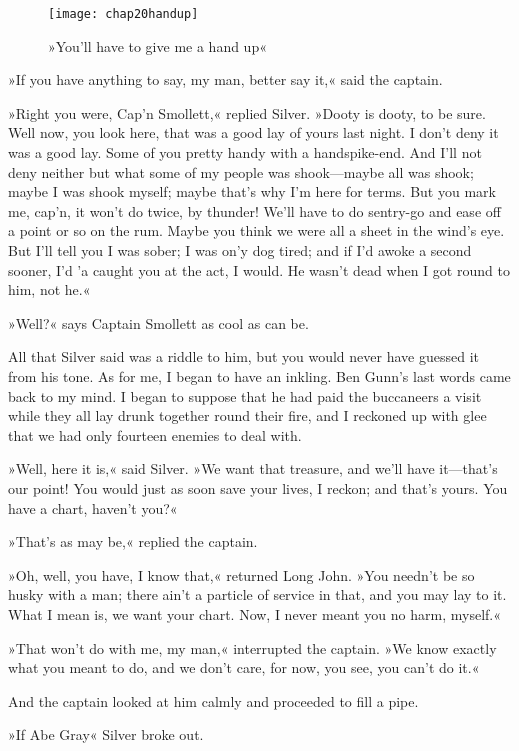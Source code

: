   \begin{figure}[p]
\centering
\texttt{[image: chap20handup]}
\caption{»You'll have to give me a hand up«}
\end{figure}  

»If you have anything to say, my man, better say it,« said the captain.

»Right you were, Cap'n Smollett,« replied Silver. »Dooty is dooty, to be sure. Well now, you look here, that was a good lay of yours last night. I don't deny it was a good lay. Some of you pretty handy with a handspike-end. And I'll not deny neither but what some of my people was shook—maybe all was shook; maybe I was shook myself; maybe that's why I'm here for terms. But you mark me, cap'n, it won't do twice, by thunder! We'll have to do sentry-go and ease off a point or so on the rum. Maybe you think we were all a sheet in the wind's eye. But I'll tell you I was sober; I was on'y dog tired; and if I'd awoke a second sooner, I'd 'a caught you at the act, I would. He wasn't dead when I got round to him, not he.«

»Well?« says Captain Smollett as cool as can be.

All that Silver said was a riddle to him, but you would never have guessed it from his tone. As for me, I began to have an inkling. Ben Gunn's last words came back to my mind. I began to suppose that he had paid the buccaneers a visit while they all lay drunk together round their fire, and I reckoned up with glee that we had only fourteen enemies to deal with.

»Well, here it is,« said Silver. »We want that treasure, and we'll have it—that's our point! You would just as soon save your lives, I reckon; and that's yours. You have a chart, haven't you?«

»That's as may be,« replied the captain.

»Oh, well, you have, I know that,« returned Long John. »You needn't be so husky with a man; there ain't a particle of service in that, and you may lay to it. What I mean is, we want your chart. Now, I never meant you no harm, myself.«

»That won't do with me, my man,« interrupted the captain. »We know exactly what you meant to do, and we don't care, for now, you see, you can't do it.«

And the captain looked at him calmly and proceeded to fill a pipe.

»If Abe Gray\longdash« Silver broke out.

